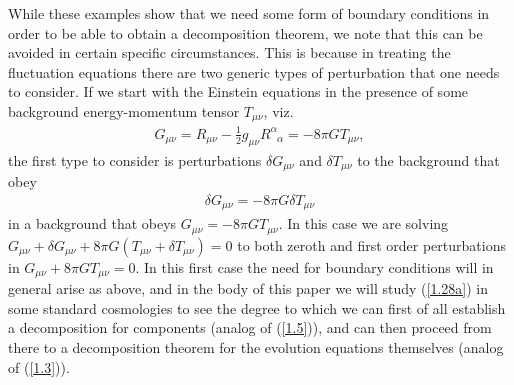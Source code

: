 \documentclass[aps,onecolumn,10pt]{revtex4}
\numberwithin{equation}{section}
\numberwithin{equation}{section}
\begin{document}
While these examples show that we need some form of boundary conditions in order to be able to obtain a decomposition theorem, we note that this can be avoided in certain specific circumstances. This is because in treating the fluctuation equations there are two generic types of perturbation that one needs to consider. If we start with the Einstein equations in the presence of some background energy-momentum tensor $T_{\mu\nu}$, viz. 
%
\begin{eqnarray}
 G_{\mu\nu}=R_{\mu\nu}-\frac{1}{2}g_{\mu\nu}R^{\alpha}_{\phantom{\alpha}\alpha}
 =-8\pi G T_{\mu\nu},
\label{1.27a}
\end{eqnarray}
%
the first type to consider is perturbations $\delta G_{\mu\nu}$ and $\delta T_{\mu\nu}$ to the background that obey 
%
\begin{eqnarray}
\delta G_{\mu\nu}=-8\pi G \delta T_{\mu\nu}
\label{1.28a}
\end{eqnarray}
%
in a background that obeys $G_{\mu\nu}=-8\pi G T_{\mu\nu}$. In this case we are solving $G_{\mu\nu}+\delta G_{\mu\nu}+8\pi G (T_{\mu\nu}+\delta T_{\mu\nu})=0$ to both zeroth and first order perturbations in $G_{\mu\nu}+8\pi G T_{\mu\nu}=0$.  In this first case the need for boundary conditions will in general arise as above, and in the body of this paper we will study (\ref{1.28a}) in some standard cosmologies to see the degree to which we can first of all establish a decomposition for components (analog of (\ref{1.5})), and can then proceed from there to a decomposition theorem for the evolution equations themselves (analog of (\ref{1.3})). 
\end{document}
